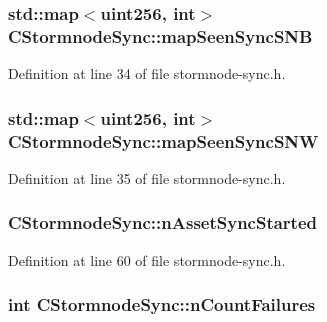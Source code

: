 \subsubsection[{map\+Seen\+Sync\+S\+N\+B}]{\setlength{\rightskip}{0pt plus 5cm}std\+::map$<${\bf uint256}, int$>$ C\+Stormnode\+Sync\+::map\+Seen\+Sync\+S\+N\+B}\label{class_c_stormnode_sync_ab5874fbd02e921572983d1530cc7d69e}


Definition at line 34 of file stormnode-\/sync.\+h.

\hypertarget{class_c_stormnode_sync_aa691249c2bfd876d49d24b82b3df7048}{}
\subsubsection[{map\+Seen\+Sync\+S\+N\+W}]{\setlength{\rightskip}{0pt plus 5cm}std\+::map$<${\bf uint256}, int$>$ C\+Stormnode\+Sync\+::map\+Seen\+Sync\+S\+N\+W}\label{class_c_stormnode_sync_aa691249c2bfd876d49d24b82b3df7048}


Definition at line 35 of file stormnode-\/sync.\+h.

\hypertarget{class_c_stormnode_sync_a2e7baab6709175db874ce9bc325c762d}{}
\subsubsection[{n\+Asset\+Sync\+Started}]{ C\+Stormnode\+Sync\+::n\+Asset\+Sync\+Started}\label{class_c_stormnode_sync_a2e7baab6709175db874ce9bc325c762d}


Definition at line 60 of file stormnode-\/sync.\+h.

\hypertarget{class_c_stormnode_sync_ad7944c7fc57bc0288472b1f88fbd88e6}{}
\subsubsection[{n\+Count\+Failures}]{\setlength{\rightskip}{0pt plus 5cm}int C\+Stormnode\+Sync\+::n\+Count\+Failures}\label{class_c_stormnode_sync_ad7944c7fc57bc0288472b1f88fbd88e6}


